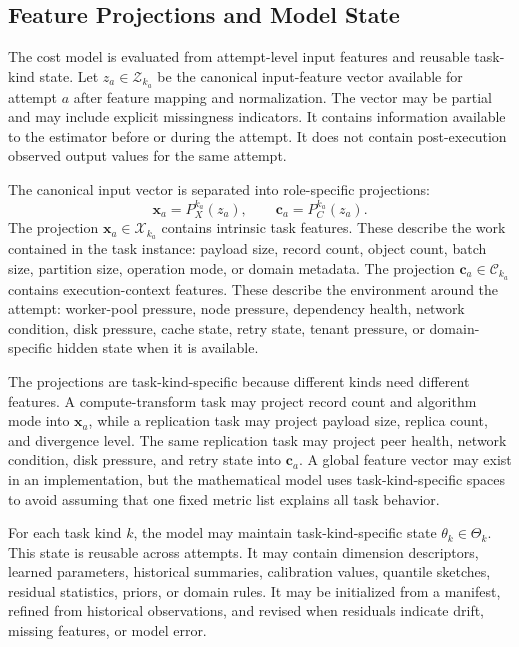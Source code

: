 \subsection{Feature Projections and Model State}
\label{sec:cost-feature-projections-model-state}

The cost model is evaluated from attempt-level input features and reusable
task-kind state. Let $z_a \in \mathcal{Z}_{k_a}$ be the canonical input-feature
vector available for attempt $a$ after feature mapping and normalization. The
vector may be partial and may include explicit missingness indicators. It
contains information available to the estimator before or during the attempt. It
does not contain post-execution observed output values for the same attempt.

The canonical input vector is separated into role-specific projections:
\[
\mathbf{x}_a = P_X^{k_a}(z_a),
\qquad
\mathbf{c}_a = P_C^{k_a}(z_a).
\]
The projection $\mathbf{x}_a \in \mathcal{X}_{k_a}$ contains intrinsic task
features. These describe the work contained in the task instance: payload size,
record count, object count, batch size, partition size, operation mode, or
domain metadata. The projection $\mathbf{c}_a \in \mathcal{C}_{k_a}$ contains
execution-context features. These describe the environment around the attempt:
worker-pool pressure, node pressure, dependency health, network condition, disk
pressure, cache state, retry state, tenant pressure, or domain-specific hidden
state when it is available.

The projections are task-kind-specific because different kinds need different
features. A compute-transform task may project record count and algorithm mode
into $\mathbf{x}_a$, while a replication task may project payload size, replica
count, and divergence level. The same replication task may project peer health,
network condition, disk pressure, and retry state into $\mathbf{c}_a$. A global
feature vector may exist in an implementation, but the mathematical model uses
task-kind-specific spaces to avoid assuming that one fixed metric list explains
all task behavior.

For each task kind $k$, the model may maintain task-kind-specific state
$\theta_k \in \Theta_k$. This state is reusable across attempts. It may contain
dimension descriptors, learned parameters, historical summaries, calibration
values, quantile sketches, residual statistics, priors, or domain rules. It may
be initialized from a manifest, refined from historical observations, and
revised when residuals indicate drift, missing features, or model error.

